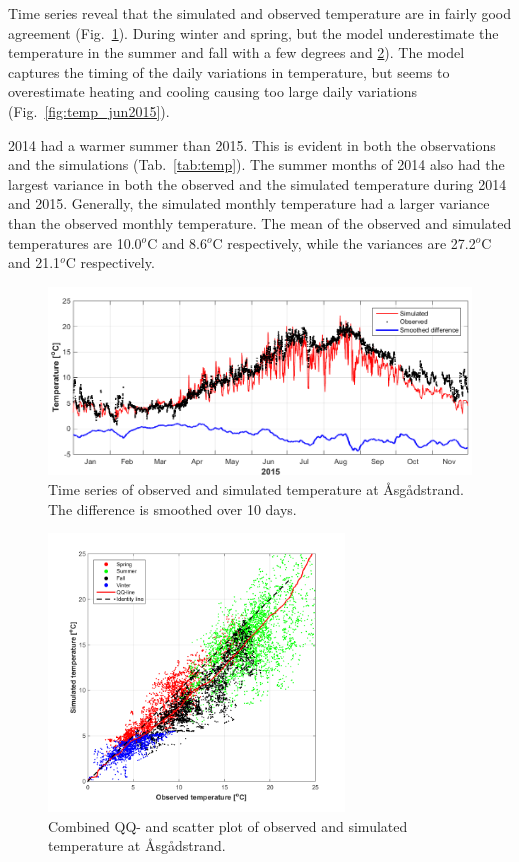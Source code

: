 Time series reveal that the simulated and observed temperature are in fairly good agreement (Fig.~\ref{fig:temp_2015}). During winter and spring, but the model underestimate the temperature in the summer and fall with a few degrees  and \ref{fig:temp-QQ_scatter}). The model captures the timing of the daily variations in temperature, but seems to overestimate heating and cooling causing too large daily variations (Fig.~\ref{fig:temp_jun2015}). 

2014 had a warmer summer than 2015. This is evident in both the observations and the simulations (Tab.~\ref{tab:temp}). The summer months of 2014 also had the largest variance in both the observed and the simulated temperature during 2014 and 2015. Generally, the simulated monthly temperature had a larger variance than the observed monthly temperature. The mean of the observed and simulated temperatures are 10.0$^o$C and 8.6$^o$C respectively, while the variances are 27.2$^o$C and 21.1$^o$C respectively.  

\begin{figure}[ht]
\centerline{
\includegraphics*[trim=0cm 0cm 0cm 0cm,clip=true,width=\textwidth]{Figurer/Temperatur_2015}}
\caption{\small
Time series of observed and simulated temperature at \AA sg\aa dstrand. The difference is smoothed over 10 days.}
\label{fig:temp_2015}
\end{figure}

\begin{figure}[htb]
\centerline{
\includegraphics*[trim=1cm 0cm 1cm 0cm,clip=true,width=0.7\textwidth]{Figurer/Temperatur_QQ_scatter}}
\caption{\small
Combined QQ- and scatter plot of observed and simulated temperature at \AA sg\aa dstrand.}
\label{fig:temp-QQ_scatter}
\end{figure}

